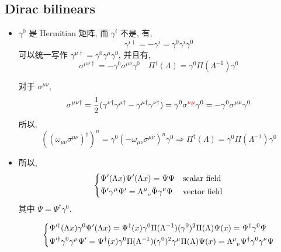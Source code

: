 \subsection{Dirac bilinears}
\begin{itemize}
	\item $\gamma^0$ 是 Hermitian 矩阵, 而 $\gamma^i$ 不是, 有,
	\begin{equation} \label{6.2.17}
		\gamma^{i \dag} = - \gamma^i = \gamma^0 \gamma^i \gamma^0
	\end{equation}
	可以统一写作 $\gamma^{\mu \dag} = \gamma^0 \gamma^\mu \gamma^0$, 并且有,
	\begin{equation}
		\sigma^{\mu \nu \dag} = - \gamma^0 \sigma^{\mu \nu} \gamma^0 \quad \Pi^\dag(\Lambda) = \gamma^0 \Pi(\Lambda^{- 1}) \gamma^0
	\end{equation}
	
	\begin{tcolorbox}[title=calculation:]
		对于 $\sigma^{\mu \nu}$,
		\begin{equation}
			\sigma^{\mu \nu \dag} = \frac{1}{2} (\gamma^{\nu \dag} \gamma^{\mu \dag} - \gamma^{\mu \dag} \gamma^{\nu \dag}) = \gamma^0 \sigma^{\mathcolor{red}{\nu \mu}} \gamma^0 = - \gamma^0 \sigma^{\mu \nu} \gamma^0
		\end{equation}
		所以,
		\begin{equation}
			((\omega_{\mu \nu} \sigma^{\mu \nu})^\dag)^n = \gamma^0 (- \omega_{\mu \nu} \sigma^{\mu \nu})^n \gamma^0 \Longrightarrow \Pi^\dag(\Lambda) = \gamma^0 \Pi(\Lambda^{- 1}) \gamma^0
		\end{equation}
	\end{tcolorbox}
	
	\item 所以,
	\begin{equation} \label{6.2.21}
		\begin{dcases}
			\bar{\Psi}'(\Lambda x) \Psi'(\Lambda x) = \bar{\Psi} \Psi & \text{scalar field} \\
			\bar{\Psi}' \gamma^\mu \Psi' = \tensor{\Lambda}{^\mu_\nu} \bar{\Psi} \gamma^\nu \Psi & \text{vector field}
		\end{dcases}
	\end{equation}
	其中 $\bar{\Psi} = \Psi^\dag \gamma^0$.
	
	\begin{tcolorbox}[title=calculation:]
		\begin{equation}
			\begin{dcases}
				\Psi'^\dag(\Lambda x) \gamma^0 \Psi'(\Lambda x) = \Psi^\dag(x) \gamma^0 \Pi(\Lambda^{- 1}) (\gamma^0)^2 \Pi(\Lambda) \Psi(x) = \Psi^\dag \gamma^0 \Psi \\
				\Psi'^\dag \gamma^0 \gamma^\mu \Psi' = \Psi^\dag(x) \gamma^0 \Pi(\Lambda^{- 1}) (\gamma^0)^2 \gamma^\mu \Pi(\Lambda) \Psi(x) = \tensor{\Lambda}{^\mu_\nu} \Psi^\dag \gamma^0 \gamma^\nu \Psi
			\end{dcases}
		\end{equation}
		

\end{tcolorbox}
\end{itemize}

